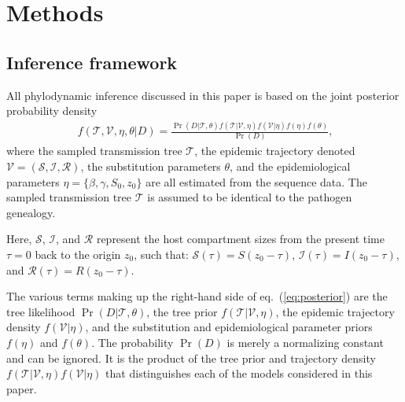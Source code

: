 \documentclass[12pt,titlepage]{article}
\newcommand{\St}{\mathcal{S}}
\newcommand{\It}{\mathcal{I}}
\newcommand{\Rt}{\mathcal{R}}
\newcommand{\traj}{\mathcal{V}}
\newcommand{\tree}{\mathcal{T}}
\begin{document}
\section{Methods}

\subsection{Inference framework}

All phylodynamic inference discussed in this paper is based on the joint posterior probability density
\begin{eqnarray}
\ f(\tree,\traj,\eta, \theta | D) = \frac{\Pr (D|\tree,\theta) f(\tree|\traj,\eta) f(\traj |\eta) f(\eta) f(\theta) }{\Pr(D)},
\label{eq:posterior}
\end{eqnarray}
where the sampled transmission tree $\tree$, the epidemic trajectory denoted $\traj = \left( \St,\It,\Rt \right)$, the substitution parameters $\theta$, and the epidemiological parameters $\eta = \{\beta,\gamma,S_0,z_0\}$ are all estimated from the sequence data.  
The sampled transmission tree $\tree$ is assumed to be identical to the pathogen genealogy.

Here, $\St$, $\It$, and $\Rt$ represent the host compartment sizes from the present time $\tau=0$ back to the origin $z_{0}$, such that:  $\St(\tau) = S(z_{0}-\tau)$, $\It(\tau) = I(z_{0}-\tau)$, and $\Rt(\tau) = R(z_{0}-\tau)$. 

The various terms making up the right-hand side of
eq.~(\ref{eq:posterior}) are the tree likelihood
$\Pr(D|\tree,\theta)$, the tree prior $f(\tree|\traj,\eta)$,
the epidemic trajectory density $f(\traj|\eta)$, and the substitution
and epidemiological parameter priors $f(\eta)$ and $f(\theta)$. The
probability $\Pr(D)$ is merely a normalizing constant and can
be ignored.  It is the product of the tree prior and trajectory
density $f(\tree|\traj,\eta)f(\traj|\eta)$ that distinguishes each of
the models considered in this paper.
\end{document}
